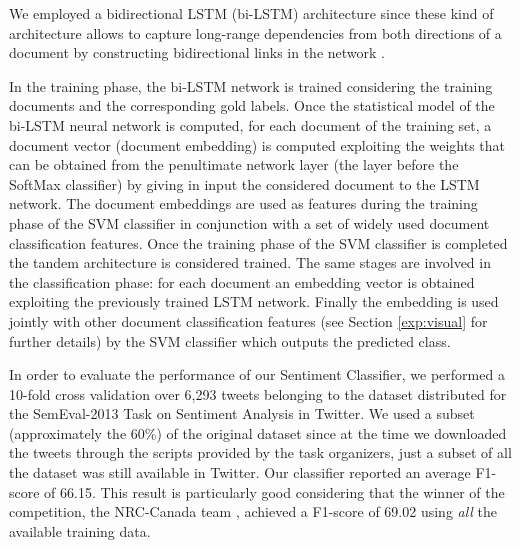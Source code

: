 We  employed  a  bidirectional  LSTM (bi-LSTM) architecture since these kind of architecture allows to capture long-range dependencies from both directions
of a document by constructing bidirectional links in the network \cite{schuster1997bidirectional}.

In the training phase, the bi-LSTM network is trained considering the training documents and the corresponding gold labels. Once the statistical model of the bi-LSTM neural network is computed, for each document of the training set, a document vector (document embedding) is computed exploiting the weights that can be obtained from the penultimate network layer (the layer before the
SoftMax classifier) by giving in input the considered document to the LSTM network. The document embeddings are used as features during the training phase of the SVM classifier in conjunction  with  a  set  of  widely  used  document  classification features. Once the training phase of the SVM classifier is completed the tandem architecture is considered trained. The  same stages are involved in the classification phase: for each document an embedding vector is obtained exploiting the  previously trained LSTM network. Finally the embedding is used jointly with other document classification features (see Section \ref{exp:visual} for further details) by the SVM classifier which outputs the predicted class.

In order to evaluate the performance of our Sentiment Classifier, we performed a 10-fold cross validation over 6,293 tweets belonging to the dataset distributed for the SemEval-2013 Task on Sentiment Analysis in Twitter. We used a subset (approximately the 60\%) of the original dataset since at the time we downloaded the tweets through the scripts provided by the task organizers, just a subset of all the dataset was still available in Twitter. Our classifier reported an average F1-score of 66.15. This result is particularly good considering that the winner of the competition, the NRC-Canada team \cite{mohammad2013nrc}, achieved a F1-score of 69.02 using \textit{all} the available training data.

